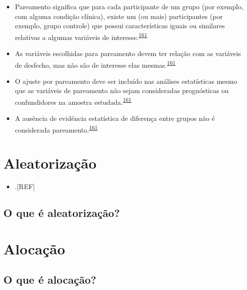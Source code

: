 \documentclass[
  a4paper,
]{book}
\providecommand{\tightlist}{%
  \setlength{\itemsep}{0pt}\setlength{\parskip}{0pt}}
\begin{document}
\begin{itemize}
\item
  Pareamento significa que para cada participante de um grupo (por exemplo, com alguma condição clínica), existe um (ou mais) participantes (por exemplo, grupo controle) que possui características iguais ou similares relativas a algumas variáveis de interesse.\textsuperscript{\protect\hyperlink{ref-Bland1994}{161}}
\item
  As variáveis escolhidas para pareamento devem ter relação com as variáveis de desfecho, mas não são de interesse elas mesmas.\textsuperscript{\protect\hyperlink{ref-Bland1994}{161}}
\item
  O ajuste por pareamento deve ser incluído nas análises estatísticas mesmo que as variáveis de pareamento não sejam consideradas prognósticas ou confundidores na amostra estudada.\textsuperscript{\protect\hyperlink{ref-Bland1994}{161}}
\item
  A ausência de evidência estatística de diferença entre grupos não é considerada pareamento.\textsuperscript{\protect\hyperlink{ref-Bland1994}{161}}
\end{itemize}

\hypertarget{aleatorizauxe7uxe3o}{%
\section{Aleatorização}\label{aleatorizauxe7uxe3o}}

\begin{itemize}
\tightlist
\item
  .{[}REF{]}
\end{itemize}

\hypertarget{o-que-uxe9-aleatorizauxe7uxe3o}{%
\subsection{O que é aleatorização?}\label{o-que-uxe9-aleatorizauxe7uxe3o}}

\hypertarget{alocacao}{%
\section{Alocação}\label{alocacao}}

\hypertarget{o-que-uxe9-alocauxe7uxe3o}{%
\subsection{O que é alocação?}\label{o-que-uxe9-alocauxe7uxe3o}}
\end{document}
